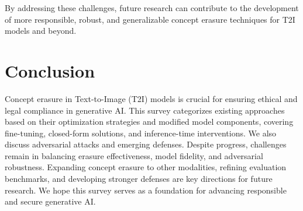 By addressing these challenges, future research can contribute to the development of more responsible, robust, and generalizable concept erasure techniques for T2I models and beyond.


\section{Conclusion} \label{sec:conclusion}
Concept erasure in Text-to-Image (T2I) models is crucial for ensuring ethical and legal compliance in generative AI. This survey categorizes existing approaches based on their optimization strategies and modified model components, covering fine-tuning, closed-form solutions, and inference-time interventions. We also discuss adversarial attacks and emerging defenses. Despite progress, challenges remain in balancing erasure effectiveness, model fidelity, and adversarial robustness. Expanding concept erasure to other modalities, refining evaluation benchmarks, and developing stronger defenses are key directions for future research. We hope this survey serves as a foundation for advancing responsible and secure generative AI.



